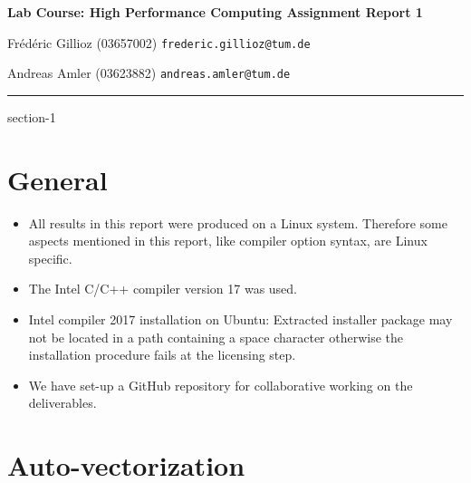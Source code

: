\documentclass[11pt]{article}
\makeatletter
\newcommand{\hwhead}[4]{
\begin{center}
\sffamily\large\bfseries Lab Course: High Performance Computing Assignment Report #1
\vspace{2mm} 
\normalfont

#2

#3
\end{center}
\vspace{6mm} \hrule \vspace{4mm}
}
\newcommand{\namea}{Frédéric Gillioz (03657002) \texttt{frederic.gillioz@tum.de}}
\newcommand{\nameb}{Andreas Amler (03623882) \texttt{andreas.amler@tum.de}}
\makeatother
\begin{document}
\hwhead{1}{\namea}{\nameb}


\setcounter{section}{-1}
\section{General}

\begin{itemize}
\item All results in this report were produced on a Linux system. Therefore some aspects mentioned in this report, like compiler option syntax, are Linux specific.
\item The Intel C/C++ compiler version 17 was used.
\item Intel compiler 2017 installation on Ubuntu: Extracted installer package may not be located in a path containing a space character otherwise the installation procedure fails at the licensing step.
\item We have set-up a GitHub repository for collaborative working on the deliverables.
\end{itemize}

\section{Auto-vectorization}
\end{document}
